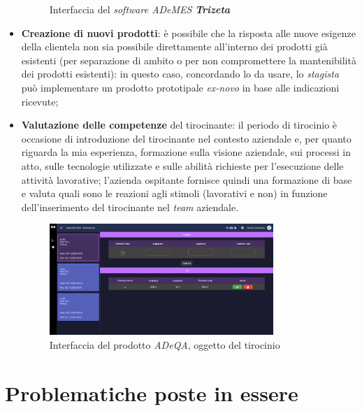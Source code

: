 \begin{itemize}
\begin{figure}[H]
            \vspace{-20mm}
            \caption[Interfaccia del \textit{software ADeMES}]{Interfaccia del \textit{software ADeMES} \textit{\textbf{Trizeta}}\footnotemark}
        \end{figure}
    \item \textbf{Creazione di nuovi prodotti}: è possibile che la risposta alle nuove esigenze della clientela non sia possibile direttamente all'interno dei prodotti già esistenti (per separazione di ambito o
        per non compromettere la mantenibilità dei prodotti esistenti): in questo caso, concordando lo  da usare, lo \textit{stagista} può implementare un prodotto prototipale \textit{ex-novo} in base alle indicazioni ricevute;
    \item \textbf{Valutazione delle competenze} del tirocinante: il periodo di tirocinio è occasione di introduzione del tirocinante nel contesto aziendale e, per quanto riguarda la mia esperienza, formazione sulla visione aziendale, sui processi in atto, sulle tecnologie utilizzate
        e sulle abilità richieste per l'esecuzione delle attività lavorative; l'azienda ospitante fornisce quindi una formazione di base e valuta quali sono le reazioni agli stimoli (lavorativi e non) in funzione dell'inserimento del tirocinante nel \textit{team} aziendale.
        \begin{figure}[H]
            \centering
            \includegraphics[width=0.8\textwidth]{images/dashboard.png}
            \caption[Interfaccia del prodotto \textit{ADeQA}]{Interfaccia del prodotto \textit{ADeQA}, oggetto del tirocinio}
        \end{figure}
\end{itemize}
\section{Problematiche poste in essere}

